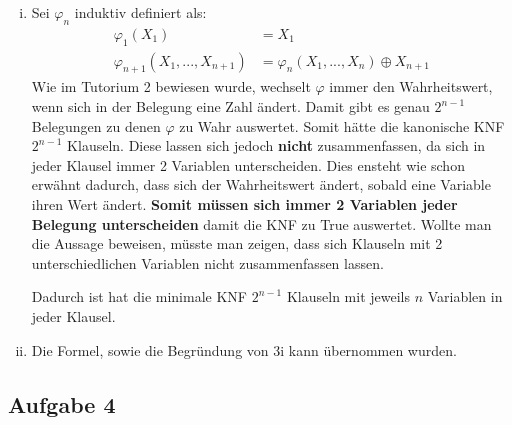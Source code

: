 \documentclass[a4paper,10pt]{article}
\begin{document}
\begin{enumerate}[(i)]
\item Sei $\varphi_n$ induktiv definiert als:
\begin{align*}
\varphi_1(X_1) &= X_1 \\
\varphi_{n+1}(X_1,...,X_{n+1}) &= \varphi_n(X_1,...,X_n) \oplus X_{n+1}
\end{align*}
Wie im Tutorium 2 bewiesen wurde, wechselt $\varphi$ immer den Wahrheitswert, wenn sich in der Belegung eine Zahl ändert. Damit gibt es genau $2^{n-1}$ Belegungen zu denen $\varphi$ zu Wahr auswertet. Somit hätte die kanonische KNF $2^{n-1}$ Klauseln. Diese lassen sich jedoch \textbf{nicht} zusammenfassen, da sich in jeder Klausel immer 2 Variablen unterscheiden. Dies ensteht wie schon erwähnt dadurch, dass sich der Wahrheitswert ändert, sobald eine Variable ihren Wert ändert. \textbf{Somit müssen sich immer 2 Variablen jeder Belegung unterscheiden} damit die KNF zu \textsf{True} auswertet. Wollte man die Aussage beweisen, müsste man zeigen, dass sich Klauseln mit 2 unterschiedlichen Variablen nicht zusammenfassen lassen. 

 Dadurch ist hat die minimale KNF $2^{n-1}$ Klauseln mit jeweils $n$ Variablen in jeder Klausel.

\item Die Formel, sowie die Begründung von 3i kann übernommen wurden.

\end{enumerate}

\subsection*{Aufgabe 4}
\end{document}
